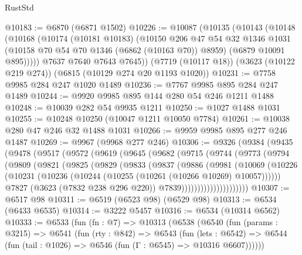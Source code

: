 \begin{lexlean}{RustStd}
\begin{coremodule}
@10183 := @6870 (@6871 @1502)
@10226 := @10087
    (@10135
      (@10143
        (@10148
          (@10168
            (@10174
              (@10181 @10183)
              (@10150
                @206
                @47
                @54
                @32
                @1346
                @1031
                (@10158 @70 @54 @70 @1346 (@6862 (@10163 @70)) @8959)
                (@6879 @10091 @895)))))
        @7637
        @7640
        @7643
        @7645))
    (@7719 (@10117 @18))
    (@3623 (@10122 @219 @274))
    (@6815 (@10129 @274 @20 @1193 @1020))
@10231 := @7758 @9985 @284 @247 @1020 @1489
@10236 := @7767 @9985 @895 @284 @247 @1489
@10244 := @9920 @9985 @895 @144 @280 @54 @246 @1211 @1488
@10248 := @10039 @282 @54 @9935 @1211
@10250 := @1027 @1488 @1031
@10255 := @10248 @10250 (@10047 @1211 @10050 @7784)
@10261 := @10038 @280 @47 @246 @32 @1488 @1031
@10266 := @9959 @9985 @895 @277 @246 @1487
@10269 := @9967 (@9968 @277 @246)
@10306 := @9326
    (@9384
      (@9435
        (@9478
          (@9517
            (@9572
              (@9619
                (@9645
                  (@9682
                    (@9715
                      (@9744
                        (@9773
                          (@9794
                            (@9809
                              (@9821
                                (@9825
                                  (@9829
                                    (@9833
                                      (@9837
                                        (@9886
                                          (@9981
                                            (@10069
                                              (@10226
                                                (@10231
                                                  (@10236
                                                    (@10244
                                                      (@10255 (@10261 (@10266 @10269) @10057))))))
                                              @7827
                                              (@3623 (@7832 @238 @296 @220))
                                              @7839)))))))))))))))))))))
@10307 := @6517 @98
@10311 := @6519 (@6523 @98) (@6529 @98)
@10313 := @6534 (@6433 @6535)
@10314 := @3222 @5457
@10316 := @6534 (@10314 @6562)
@10333 := @6533
    (fun (fn : @7) =>
    @10313
      (@6538
        (@6540
          (fun (params : @3215) =>
          @6541
            (fun (rty : @842) =>
            @6543
              (fun (lets : @6542) =>
              @6544 (fun (tail : @1026) => @6546 (fun (Γ : @6545) => @10316 @6607))))))

\end{coremodule}
\end{lexlean}
